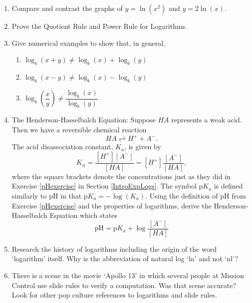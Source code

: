 \begin{enumerate}
\setcounter{enumi}{\value{HW}}

\item Compare and contrast the graphs of $y = \ln(x^{2})$ and $y = 2\ln(x)$.

\item Prove the Quotient Rule and Power Rule for Logarithms.

\item Give numerical examples to show that, in general,

\begin{enumerate}

\item $\log_{b}(x + y) \neq \log_{b}(x) + \log_{b}(y)$
\item $\log_{b}(x - y) \neq \log_{b}(x) - \log_{b}(y)$
\item $\log_{b}\left(\dfrac{x}{y}\right) \neq \dfrac{\log_{b}(x)}{\log_{b}(y)}$

\end{enumerate}

\item \label{HendersonHasselbalch}  The Henderson-Hasselbalch Equation:  Suppose $HA$ represents a weak acid. Then we have a reversible chemical reaction 
\[HA \rightleftharpoons H^{+} + A^{-}.\]  
The acid disassociation constant, $K_{a}$, is given by 
\[K_{\alpha} = \frac{[H^{+}][A^{-}]}{[HA]} = [H^{+}]\frac{[A^{-}]}{[HA]},\]
where the square brackets denote the concentrations just as they did in Exercise \ref{pHexercise} in Section \ref{IntroExpLogs}.  The symbol p$K_{a}$ is defined similarly to pH in that p$K_{a} = -\log(K_{a})$.  Using the definition of pH from Exercise \ref{pHexercise} and the properties of logarithms, derive the Henderson-Hasselbalch Equation which states 
\[\mbox{pH} = \mbox{p}K_{a} + \log\dfrac{[A^{-}]}{[HA]}\]

\item Research the history of logarithms including the origin of the word `logarithm' itself.  Why is the abbreviation of natural log `ln' and not `nl'?

\item There is a scene in the movie `Apollo 13' in which several people at Mission Control use slide rules to verify a computation.  Was that scene accurate?  Look for other pop culture references to logarithms and slide rules.

\end{enumerate}

